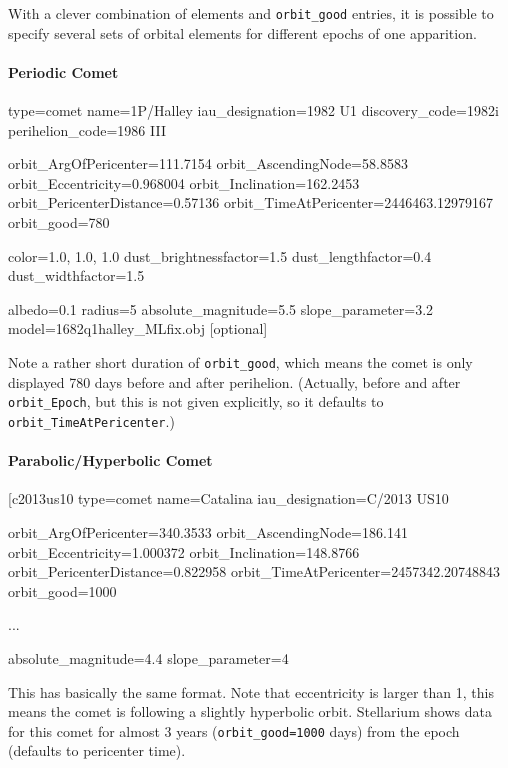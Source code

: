With a clever combination of elements and \texttt{orbit\_good}
entries,  it is possible to specify several sets of
orbital elements for different epochs of one apparition.

\paragraph{Periodic Comet}
\label{sec:ssystem.ini:Comet:Periodic}

\begin{configfile}
[1phalley]
type=comet  
name=1P/Halley
iau_designation=1982 U1
discovery_code=1982i
perihelion_code=1986 III

orbit_ArgOfPericenter=111.7154
orbit_AscendingNode=58.8583
orbit_Eccentricity=0.968004
orbit_Inclination=162.2453
orbit_PericenterDistance=0.57136
orbit_TimeAtPericenter=2446463.12979167
orbit_good=780

color=1.0, 1.0, 1.0
dust_brightnessfactor=1.5
dust_lengthfactor=0.4
dust_widthfactor=1.5

albedo=0.1
radius=5
absolute_magnitude=5.5
slope_parameter=3.2
model=1682q1halley_MLfix.obj [optional]
\end{configfile}

Note a rather short duration of
\texttt{orbit\_good}, which means the comet is only displayed 780 days
before and after perihelion. (Actually, before and after
\texttt{orbit\_Epoch}, but this is not given explicitly, so it
defaults to \texttt{orbit\_TimeAtPericenter}.)


\paragraph{Parabolic/Hyperbolic Comet}
\label{sec:ssystem.ini:Comet:Parabolic}

\begin{configfile}
[c2013us10%
type=comet
name=Catalina
iau_designation=C/2013 US10

orbit_ArgOfPericenter=340.3533
orbit_AscendingNode=186.141
orbit_Eccentricity=1.000372
orbit_Inclination=148.8766
orbit_PericenterDistance=0.822958
orbit_TimeAtPericenter=2457342.20748843
orbit_good=1000

...

absolute_magnitude=4.4
slope_parameter=4
\end{configfile}

This has basically the same format. Note that eccentricity is larger than 1,
this means the comet is following a slightly hyperbolic
orbit. Stellarium shows data for this comet for almost 3 years
(\texttt{orbit\_good=1000} days) from the epoch (defaults to pericenter time).



